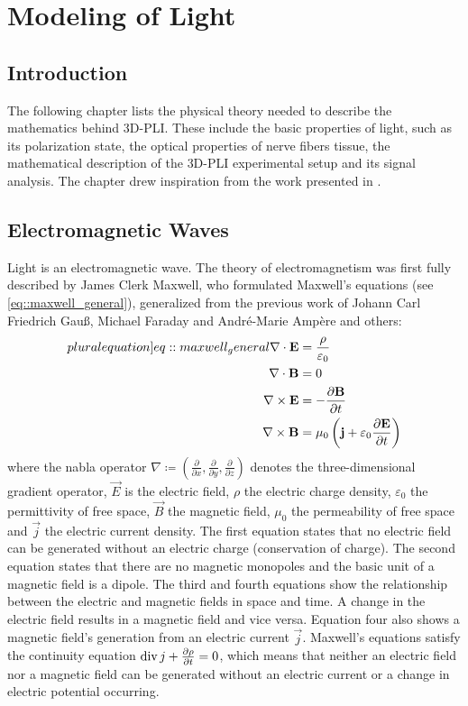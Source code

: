 \cleardoublepage
\setcounter{chapter}{2}
\chapter{Modeling of Light}
\label{sec:theory}
%
\section{Introduction}
The following chapter lists the physical theory needed to describe the mathematics behind \ac{3D-PLI}.
These include the basic properties of light, such as its polarization state, the optical properties of nerve fibers tissue, the mathematical description of the \ac{3D-PLI} experimental setup and its signal analysis.
The chapter drew inspiration from the work presented in \cite{demtroeder2, Fliebach2012}.
%
%
%
\section{Electromagnetic Waves}
%
Light is an electromagnetic wave.
The theory of electromagnetism was first fully described by James Clerk Maxwell, who formulated Maxwell's equations (see \cref{eq::maxwell_general}), generalized from the previous work of Johann Carl Friedrich Gau{\ss}, Michael Faraday and Andr{\'e}-Marie Amp{\`e}re and others:
%
\begin{align}
\begin{split} \label[pluralequation]{eq::maxwell_general}
    \nabla \cdot \vec{E} &= \frac {\rho} {\varepsilon_0}\\
    \nabla \cdot \vec{B} &= 0\\
    \nabla \times \vec{E} &= -\frac{\partial \vec{B}} {\partial t}\\
    \nabla \times \vec{B} &= \mu_0 \left( \vec{j} + \varepsilon_0 \frac{\partial \vec{E}} {\partial t} \right)
\end{split}
\end{align}
%
where the nabla operator $\nabla \coloneqq \left({\frac{\partial}{\partial x}}, {\frac{\partial}{\partial y}}, {\frac{\partial}{\partial z}} \right)$ denotes the three-dimensional gradient operator, $\vec{E}$ is the electric field, $\rho$ the electric charge density, $\varepsilon_0$ the permittivity of free space, $\vec{B}$ the magnetic field, $\mu_0$ the permeability of free space and $\vec{j}$ the electric current density.
The first equation states that no electric field can be generated without an electric charge (conservation of charge).
The second equation states that there are no magnetic monopoles and the basic unit of a magnetic field is a dipole.
The third and fourth equations show the relationship between the electric and magnetic fields in space and time.
A change in the electric field results in a magnetic field and vice versa.
Equation four also shows a magnetic field's generation from an electric current $\vec{j}$.
Maxwell's equations satisfy the continuity equation $\operatorname{div} j + \frac{\partial \rho}{\partial t} = 0$, which means that neither an electric field nor a magnetic field can be generated without an electric current or a change in electric potential occurring.
%
%
